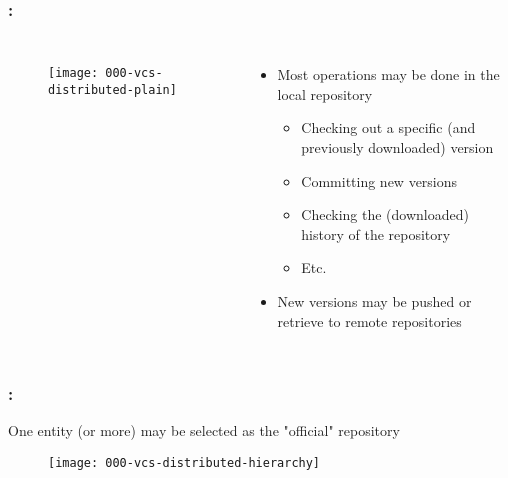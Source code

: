 \begin{frame}
    \frametitle{\secname: \small\subsecname\normalsize}

    \begin{columns}

        \begin{figure}[h]
            \texttt{[image: 000-vcs-distributed-plain]}
            \centering
        \end{figure}

            \begin{itemize}
                \item Most operations may be done in the local repository
                \begin{itemize}
                    \item Checking out a specific (and previously downloaded) version
                    \item Committing new versions
                    \item Checking the (downloaded) history of the repository
                    \item Etc.
                \end{itemize}
                \item New versions may be pushed or retrieve to remote repositories
            \end{itemize}
    \end{columns}
\end{frame}

\begin{frame}
    \frametitle{\secname: \small\subsecname\normalsize}

    One entity (or more) may be selected as the "official" repository

    \begin{figure}[h]
        \texttt{[image: 000-vcs-distributed-hierarchy]}
        \centering
    \end{figure}
\end{frame}

